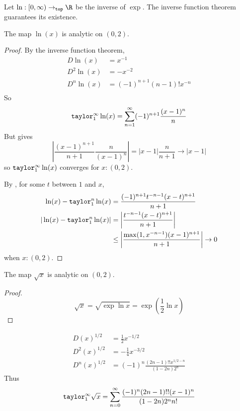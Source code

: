 \documentclass[10pt]{scrartcl}
\newcommand{\cattop}{\mathtt{top}}
\begin{document}
\begin{defn}[$\ln$]
  Let $\ln:[0,\infty)\to_\cattop\R$ be the inverse of $\exp$. The inverse function theorem guarantees its existence.
\end{defn}

\begin{theorem}
  The map $\ln (x)$ is analytic on $(0,2)$. 
\end{theorem}
\begin{proof}
  By the inverse function theorem, 
  \begin{align*}
    D\ln(x)&=x^{-1} \\
    D^2\ln(x)&=-x^{-2}\\
    D^n\ln(x)&=(-1)^{n+1}(n-1)!x^{-n}\\
  \end{align*}
  So 
  \[
  \mathtt{taylor}_1^\infty\ln(x)=\sum_{n=1}^\infty (-1)^{n+1}\frac{(x-1)^{n}}{n}
  \]
  But  gives 
  \[
  \left|\frac{(x-1)^{n+1}}{n+1}\frac{n}{(x-1)^n}\right|=|x-1|\frac{n}{n+1}\to |x-1|
  \]
  so $\mathtt{taylor}_1^\infty\ln(x)$ converges for $x:(0,2)$.

  By , for some $t$ between $1$ and $x$, 
  \begin{align*}
    \ln(x)-\mathtt{taylor}_1^n\ln(x) &= \frac{(-1)^{n+1}t^{-n-1}(x-t)^{n+1}}{n+1}\\
    |\ln(x)-\mathtt{taylor}_1^n\ln(x)| &= \left| \frac{t^{-n-1}(x-t)^{n+1}}{n+1}\right|\\
                             &\leq \left|\frac{\max(1,x^{-n-1})(x-1)^{n+1}}{n+1}\right|\to 0
  \end{align*}
  when $x:(0,2)$. 
\end{proof}

\begin{cor}
  The map $\sqrt{x}$ is analytic on $(0,2)$. 
\end{cor}
\begin{proof}
  \[
  \sqrt{x}=\sqrt{\exp\ln x}=\exp\left(\frac 1 2 \ln x\right)
  \]
\end{proof}
\begin{example}
  \begin{align*}
    D(x)^{1/2}&=\frac 1 2 x^{-1/2}\\
    D^2(x)^{1/2}&=-\frac 1 4 x^{-3/2}\\
    D^n(x)^{1/2}&=(-1)^{n}\frac{(2n-1)!! x^{1/2-n}}{(1-2n)2^n}
  \end{align*}
  Thus
  \[
  \mathtt{taylor}_1^\infty \sqrt{x}=\sum_{n=0}^\infty \frac{(-1)^{n}
    (2n-1)!!(x-1)^n}{(1-2n)2^nn!}
  \]
\end{example}
\end{document}
